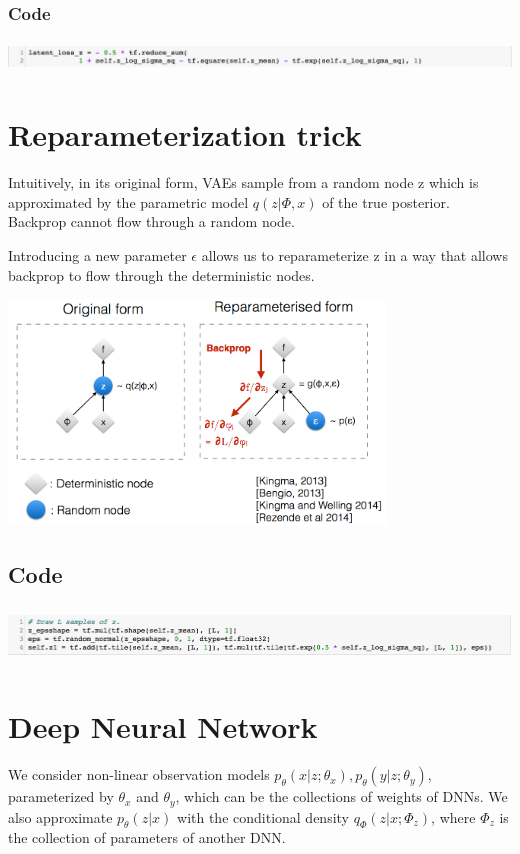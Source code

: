 \documentclass[a4paper]{article}
\begin{document}
\subsubsection{Code}
\includegraphics[width=17cm, height=0.8cm]{kl_code.png}
\section{Reparameterization trick}

Intuitively, in its original form, VAEs sample from a random node z which is approximated by the parametric model $q(z | \Phi,x)$ of the true posterior. Backprop cannot flow through a random node.

Introducing a new parameter $\epsilon$ allows us to reparameterize z in a way that allows backprop to flow through the deterministic nodes.
\begin{center}
\includegraphics[width=10cm, height=6cm]{repara.png}
\end{center}
\subsection{Code}
\includegraphics[width=17cm, height=1.5cm]{repa_code.png}
\section{Deep Neural Network}

We consider non-linear observation models $p_\theta(x|z;\theta_x), p_\theta(y|z;\theta_y)$, parameterized by $\theta_x$ and $\theta_y$, which can be the collections of weights of DNNs. We also approximate $p_\theta(z|x)$ with the conditional density $q_\Phi(z|x;\Phi_z)$, where $\Phi_z$ is the collection of parameters of another DNN.
\end{document}

